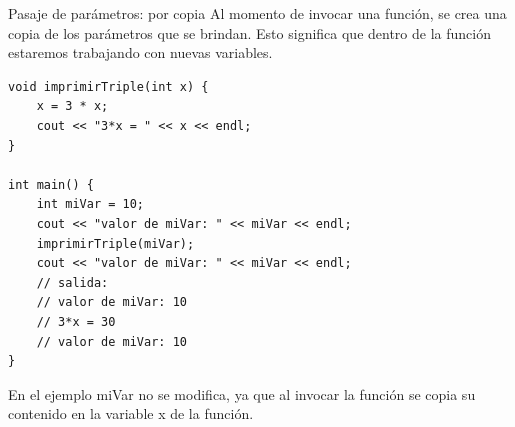 \documentclass[12pt]{beamer}
\begin{document}
\begin{frame}[fragile]{Pasaje de parámetros: por copia}
    Al momento de invocar una función, se crea una copia de los parámetros que se brindan.
    Esto significa que dentro de la función estaremos trabajando con nuevas variables. \\
\begin{lstlisting}[basicstyle=\tiny]
void imprimirTriple(int x) {
    x = 3 * x;
    cout << "3*x = " << x << endl;
}      

int main() {
    int miVar = 10;
    cout << "valor de miVar: " << miVar << endl;
    imprimirTriple(miVar);
    cout << "valor de miVar: " << miVar << endl;
    // salida:
    // valor de miVar: 10
    // 3*x = 30
    // valor de miVar: 10
}
\end{lstlisting}

En el ejemplo \alert{miVar} no se modifica, ya que al invocar la función se copia su contenido en la variable x de la función.

\end{frame}
\end{document}
